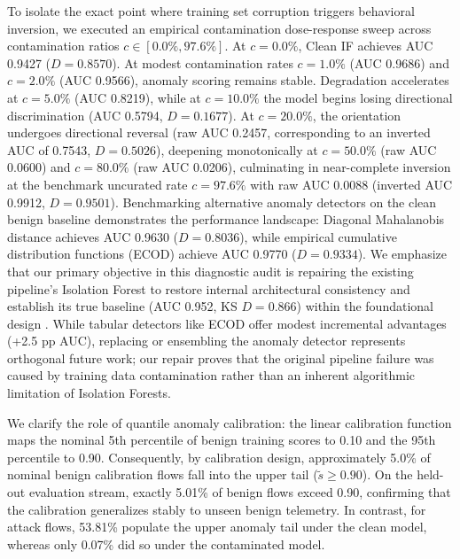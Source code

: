 \documentclass[journal,10pt,onecolumn]{IEEEtran}
\begin{document}
To isolate the exact point where training set corruption triggers behavioral inversion, we executed an empirical contamination dose-response sweep across contamination ratios $c \in [0.0\%, 97.6\%]$. At $c = 0.0\%$, Clean IF achieves AUC 0.9427 ($D = 0.8570$). At modest contamination rates $c = 1.0\%$ (AUC 0.9686) and $c = 2.0\%$ (AUC 0.9566), anomaly scoring remains stable. Degradation accelerates at $c = 5.0\%$ (AUC 0.8219), while at $c = 10.0\%$ the model begins losing directional discrimination (AUC 0.5794, $D = 0.1677$). At $c = 20.0\%$, the orientation undergoes directional reversal (raw AUC 0.2457, corresponding to an inverted AUC of 0.7543, $D = 0.5026$), deepening monotonically at $c = 50.0\%$ (raw AUC 0.0600) and $c = 80.0\%$ (raw AUC 0.0206), culminating in near-complete inversion at the benchmark uncurated rate $c = 97.6\%$ with raw AUC 0.0088 (inverted AUC 0.9912, $D = 0.9501$). Benchmarking alternative anomaly detectors on the clean benign baseline demonstrates the performance landscape: Diagonal Mahalanobis distance achieves AUC 0.9630 ($D = 0.8036$), while empirical cumulative distribution functions (ECOD) achieve AUC 0.9770 ($D = 0.9334$). We emphasize that our primary objective in this diagnostic audit is repairing the existing pipeline's Isolation Forest to restore internal architectural consistency and establish its true baseline (AUC 0.952, KS $D=0.866$) within the foundational design \cite{1}. While tabular detectors like ECOD offer modest incremental advantages (+2.5 pp AUC), replacing or ensembling the anomaly detector represents orthogonal future work; our repair proves that the original pipeline failure was caused by training data contamination rather than an inherent algorithmic limitation of Isolation Forests.

We clarify the role of quantile anomaly calibration: the linear calibration function maps the nominal 5th percentile of benign training scores to 0.10 and the 95th percentile to 0.90. Consequently, by calibration design, approximately 5.0\% of nominal benign calibration flows fall into the upper tail ($\tilde{s} \ge 0.90$). On the held-out evaluation stream, exactly 5.01\% of benign flows exceed 0.90, confirming that the calibration generalizes stably to unseen benign telemetry. In contrast, for attack flows, 53.81\% populate the upper anomaly tail under the clean model, whereas only 0.07\% did so under the contaminated model.
\end{document}
